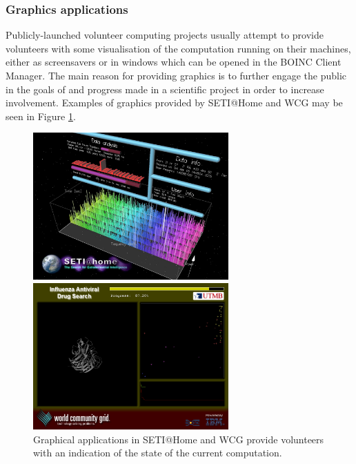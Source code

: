 \subsubsection{Graphics applications} \label{Bgraphics}
Publicly-launched volunteer computing projects usually attempt to provide volunteers with some visualisation of the computation running on their machines, either as   screensavers or in   windows which can be opened in the BOINC Client Manager. The main reason for providing graphics is to further engage the public in the goals of and progress made in a scientific project in order to increase involvement. Examples of graphics provided by SETI@Home and WCG may be seen in Figure \ref{fig:boincgraphics}.
\begin{figure}[htb]
\centering
\begin{minipage}{7.5cm}
\includegraphics[width=7.5cm]{images/graphics1}
 \end{minipage} \hspace{.1cm}
\begin{minipage}{7.5cm}
\includegraphics[width=7.5cm]{images/graphics2}
 \end{minipage}
\caption{Graphical applications in SETI@Home and WCG provide volunteers with an indication of the state of the current computation.} \label{fig:boincgraphics} 
\end{figure}

